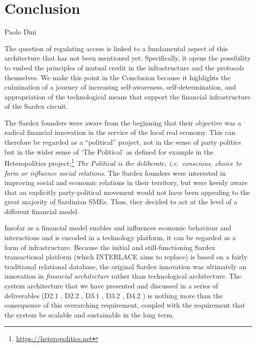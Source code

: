 \chapter{Conclusion}

\vspace{-1cm}
\begin{center}
Paolo Dini
\end{center}

The question of regulating access is linked to a fundamental aspect of this architecture that has not been mentioned yet. Specifically, it opens the possibility to embed the principles of mutual credit in the infrastructure and the protocols themselves. We make this point in the Conclusion because it highlights the culmination of a journey of increasing self-awareness, self-determination, and appropriation of the technological means that support the financial infrastructure of the Sardex circuit.

The Sardex founders were aware from the beginning that their objective was a radical financial innovation in the service of the local real economy. This can therefore be regarded as a ``political'' project, not in the sense of party politics but in the wider sense of `The Political' as defined for example in the Heteropolitics project:\footnote{\url{https://heteropolitics.net}} \emph{The Political is the deliberate, i.e.\ conscious, choice to form or influence social relations}. The Sardex founders were interested in improving social and economic relations in their territory, but were keenly aware that an explicitly party-political movement would not have been appealing to the great majority of Sardinian SMEs. Thus, they decided to act at the level of a different financial model.

Insofar as a financial model enables and influences economic behaviour and interactions and is encoded in a technology platform, it can be regarded as a form of infrastructure. Because the initial and still-functioning Sardex transactional platform (which INTERLACE aims to replace) is based on a fairly traditional relational database, the original Sardex innovation was ultimately an innovation in \emph{financial architecture} rather than technological architecture. The system architecture that we have presented and discussed in a series of deliverables (D2.1 \cite{INTERLACE_D21}, D2.2 \cite{INTERLACE_D22}, D3.1 \cite{INTERLACE_D31}, D3.2 \cite{INTERLACE_D32}, D4.2 \cite{INTERLACE_D42}) is nothing more than the consequence of this overarching requirement, coupled with the requirement that the system be scalable and sustainable in the long term.

